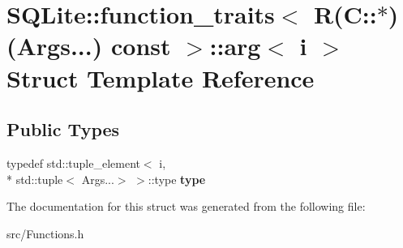 \hypertarget{struct_s_q_lite_1_1function__traits_3_01_r_07_c_1_1_5_08_07_args_8_8_8_08_01const_01_01_4_1_1arg}{\section{S\-Q\-Lite\-:\-:function\-\_\-traits$<$ R(C\-:\-:$\ast$)(Args...) const $>$\-:\-:arg$<$ i $>$ Struct Template Reference}
\label{struct_s_q_lite_1_1function__traits_3_01_r_07_c_1_1_5_08_07_args_8_8_8_08_01const_01_01_4_1_1arg}
}
\subsection*{Public Types}
\begin{DoxyCompactItemize}
\item 
\hypertarget{struct_s_q_lite_1_1function__traits_3_01_r_07_c_1_1_5_08_07_args_8_8_8_08_01const_01_01_4_1_1arg_a7785567b43a6fb69906f09403f99e31f}{typedef std\-::tuple\-\_\-element$<$ i, \\*
std\-::tuple$<$ Args...$>$ $>$\-::type {\bfseries type}}\label{struct_s_q_lite_1_1function__traits_3_01_r_07_c_1_1_5_08_07_args_8_8_8_08_01const_01_01_4_1_1arg_a7785567b43a6fb69906f09403f99e31f}

\end{DoxyCompactItemize}


The documentation for this struct was generated from the following file\-:\begin{DoxyCompactItemize}
\item 
src/Functions.\-h\end{DoxyCompactItemize}
